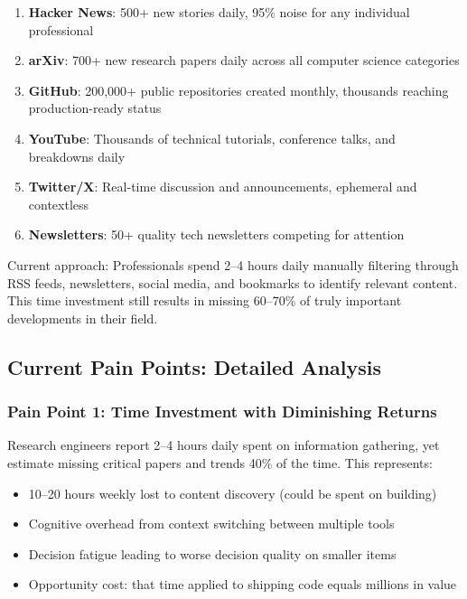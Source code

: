 \documentclass{report}
\begin{document}
\begin{enumerate}
    \item \textbf{Hacker News}: 500+ new stories daily, 95\% noise for any individual professional
    \item \textbf{arXiv}: 700+ new research papers daily across all computer science categories
    \item \textbf{GitHub}: 200,000+ public repositories created monthly, thousands reaching production-ready status
    \item \textbf{YouTube}: Thousands of technical tutorials, conference talks, and breakdowns daily
    \item \textbf{Twitter/X}: Real-time discussion and announcements, ephemeral and contextless
    \item \textbf{Newsletters}: 50+ quality tech newsletters competing for attention
\end{enumerate}

Current approach: Professionals spend 2--4 hours daily manually filtering through RSS feeds, newsletters, social media, and bookmarks to identify relevant content. This time investment still results in missing 60--70\% of truly important developments in their field.

\subsection{Current Pain Points: Detailed Analysis}

\subsubsection{Pain Point 1: Time Investment with Diminishing Returns}

Research engineers report 2--4 hours daily spent on information gathering, yet estimate missing critical papers and trends 40\% of the time. This represents:
\begin{itemize}
    \item 10--20 hours weekly lost to content discovery (could be spent on building)
    \item Cognitive overhead from context switching between multiple tools
    \item Decision fatigue leading to worse decision quality on smaller items
    \item Opportunity cost: that time applied to shipping code equals millions in value
\end{itemize}
\end{document}

